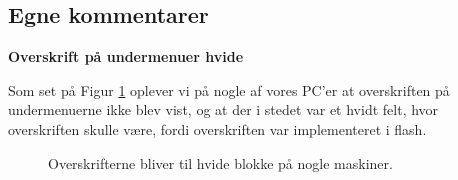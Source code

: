 \documentclass[10pt,a4paper]{article}      %
\newcommand\pic[1]{\texttt{[image: Pics/\#1]}}
\renewcommand\smallproblem{\pic{smallproblem}}
\begin{document}
\subsection{Egne kommentarer}

\begin{kommentarer}
  \item[\smallproblem]{\textbf{Overskrift på undermenuer hvide}}

  Som set på Figur \ref{fig:hvideblokke} oplever vi på nogle af vores PC'er at
  overskriften på undermenuerne ikke blev vist, og at der i stedet var et hvidt
  felt, hvor overskriften skulle være, fordi overskriften var implementeret i
  flash.
\end{kommentarer}


\begin{figure}[htbp]
    \centering
    \caption{Overskrifterne bliver til hvide blokke på nogle maskiner.}
    \label{fig:hvideblokke}
\end{figure}
\end{document}
